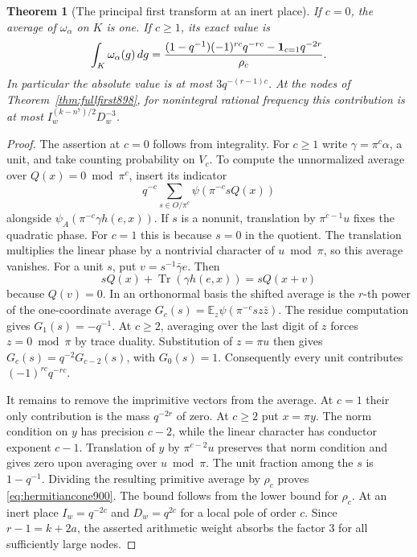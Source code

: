 \documentclass[a4paper,11pt]{article}
\newtheorem{theorem}[proposition]{Theorem}
\theoremstyle{definition}
\theoremstyle{remark}
\numberwithin{equation}{section}
\begin{document}
\begin{theorem}[The principal first transform at an inert place]
\leavevmode\label{thm:hermitiancone900}
If \(c=0\), the average of \(\omega_\alpha\) on \(K\) is one.
If \(c\ge1\), its exact value is
\begin{equation}
 \int_K\omega_\alpha(g)\,dg
   =\frac{(1-q^{-1})(-1)^{rc}q^{-rc}
                   -{\bf1}_{c=1}q^{-2r}}{\rho_c}.
 \label{eq:hermitiancone900}
\end{equation}
In particular the absolute value is at most
\(3q^{-(r-1)c}\). At the nodes of Theorem~\ref{thm:fullfirst898},
for nonintegral rational frequency this contribution is at most
\(I_w^{(k-n^7)/2}D_w^{-3}\).
\end{theorem}
\begin{proof}
The assertion at \(c=0\) follows from integrality. For \(c\ge1\)
write \(\gamma=\pi^c\alpha\), a unit, and take counting
probability on \(V_c\). To compute the unnormalized average
over \(Q(x)=0\bmod\pi^c\), insert its indicator
\[
          q^{-c}\sum_{s\in O/\pi^c}\psi(\pi^{-c}s Q(x))
\]
alongside \(\psi_A(\pi^{-c}\gamma h(e,x))\).
If \(s\) is a nonunit, translation by \(\pi^{c-1}u\) fixes
the quadratic phase. For \(c=1\) this is because \(s=0\)
in the quotient. The translation multiplies the linear phase by
a nontrivial character of \(u\bmod\pi\), so this average vanishes.
For a unit \(s\), put \(v=s^{-1}\bar\gamma e\). Then
\[
          sQ(x)+\operatorname{Tr}(\gamma h(e,x))=sQ(x+v)
\]
because \(Q(v)=0\). In an orthonormal basis the shifted average
is the \(r\)-th power of the one-coordinate average
\(G_c(s)=\mathbb E_z\psi(\pi^{-c}s z\bar z)\).
The residue computation gives \(G_1(s)=-q^{-1}\).
At \(c\ge2\), averaging over the last digit of \(z\) forces
\(z=0\bmod\pi\) by trace duality. Substitution of \(z=\pi u\)
then gives \(G_c(s)=q^{-2}G_{c-2}(s)\), with \(G_0(s)=1\).
Consequently every unit contributes \((-1)^{rc}q^{-rc}\).

It remains to remove the imprimitive vectors from the average.
At \(c=1\) their only contribution is the mass \(q^{-2r}\) of
zero. At \(c\ge2\) put \(x=\pi y\). The norm condition on \(y\)
has precision \(c-2\), while the linear character has conductor
exponent \(c-1\). Translation of \(y\) by \(\pi^{c-2}u\)
preserves that norm condition and gives zero upon averaging over
\(u\bmod\pi\). The unit fraction among the \(s\) is \(1-q^{-1}\).
Dividing the resulting primitive average by \(\rho_c\) proves
\eqref{eq:hermitiancone900}. The bound follows from the lower
bound for \(\rho_c\). At an inert place \(I_w=q^{-2c}\) and
\(D_w=q^{2c}\) for a local pole of order \(c\).
Since \(r-1=k+2a\), the asserted arithmetic weight absorbs the
factor \(3\) for all sufficiently large nodes.
\end{proof}
\end{document}
